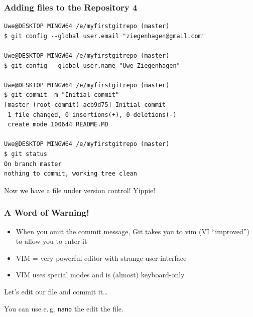 \documentclass[12pt,english]{beamer}
\begin{document}
\begin{frame}[containsverbatim]
\frametitle{Adding files to the Repository 4} 




\begin{lstlisting}[basicstyle=\ttfamily\scriptsize]
Uwe@DESKTOP MINGW64 /e/myfirstgitrepo (master)
$ git config --global user.email "ziegenhagen@gmail.com"

Uwe@DESKTOP MINGW64 /e/myfirstgitrepo (master)
$ git config --global user.name "Uwe Ziegenhagen"

Uwe@DESKTOP MINGW64 /e/myfirstgitrepo (master)
$ git commit -m "Initial commit"
[master (root-commit) acb9d75] Initial commit
 1 file changed, 0 insertions(+), 0 deletions(-)
 create mode 100644 README.MD

Uwe@DESKTOP MINGW64 /e/myfirstgitrepo (master)
$ git status
On branch master
nothing to commit, working tree clean
\end{lstlisting}

Now we have a file under version control! Yippie!

\end{frame}

\begin{frame}
\frametitle{A Word of Warning!}

\begin{itemize}
\item When you omit the commit message, Git takes you to vim (VI \enquote{improved}) to allow you to enter it
\item VIM = very powerful editor with strange user interface
\item VIM uses special modes and is (almost) keyboard-only
\end{itemize}

Let's edit our file and commit it\ldots 

You can use e.\,g. \texttt{nano} the edit the file.

\end{frame}
\end{document}
